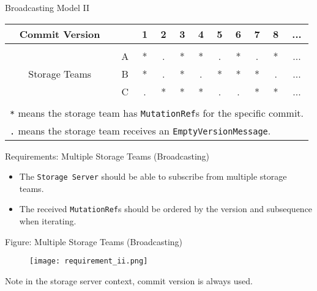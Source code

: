 \documentclass[9pt]{beamer}
\begin{document}
    \begin{frame}{Broadcasting Model II}
        \begin{table}
            \begin{center}
                \begin{tabular}{ccccccccccc}
                    Commit Version & &1 & 2 & 3 & 4 & 5 & 6 & 7 & 8 & ... \\
                    \hline\\
                    \multirow{3}{*}{Storage Teams} & A & * & . & * & * & . & * & . & * & ...\\
                    & B & * & . & * & . & * & * & * & . & ...\\
                    & C & . & * & * & * & . & . & * & * & ... \\
                    \hspace{0.2em}\\
                    
                    \multicolumn{11}{l}{\footnotesize \texttt{*} means the storage team has \texttt{MutationRef}s for the specific commit.}\\
                    
                    \multicolumn{11}{l}{\footnotesize \texttt{.} means the storage team receives an \texttt{EmptyVersionMessage}.}
                \end{tabular}
            \end{center}
        \end{table}
    \end{frame}
    
    \begin{frame}{Requirements: Multiple Storage Teams (Broadcasting)}
        \begin{itemize}
            \item The \texttt{Storage Server} should be able to subscribe from multiple storage teams.
            \item The received \texttt{MutationRef}s should be ordered by the version {\color{gray}and subsequence} when iterating.
        \end{itemize}
    \end{frame}
    
    \begin{frame}{Figure: Multiple Storage Teams (Broadcasting)}
        \begin{figure}
            \texttt{[image: requirement\_ii.png]}
        \end{figure}
        
        {\footnotesize Note in the storage server context, commit version is always used.}
    \end{frame}
    
\end{document}
